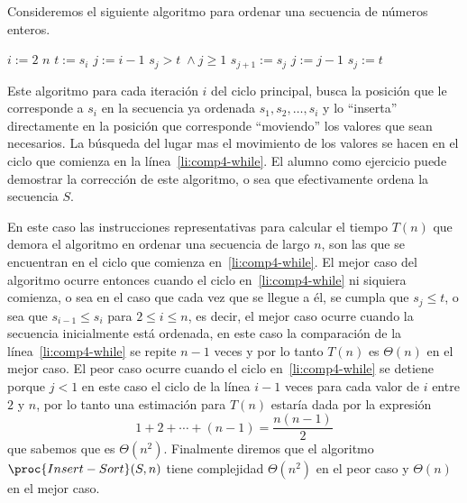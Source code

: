 \begin{ejemplo}
Consideremos el siguiente algoritmo para ordenar una secuencia de números enteros.
\begin{codebox}
\li \For $i:=2$ \To $n$ \label{li:comp4-for}
\li \> $t:=s_i$
\li \> $j:=i-1$
\li \> \While $s_j>t\;\wedge j\geq 1$ \Do \label{li:comp4-while}
\li \> \> $s_{j+1}:=s_j$ \label{li:comp4-asig}
\li \> \> $j:=j-1$ \label{li:comp4-dec}
\li \> $s_j:=t$
\end{codebox}

Este algoritmo para cada iteración $i$ del ciclo principal, busca la posición que le corresponde a $s_i$ en la secuencia ya ordenada $s_1,s_2,\ldots,s_i$ y lo ``inserta'' directamente en la posición que corresponde ``moviendo'' los valores que sean necesarios.
La búsqueda del lugar mas el movimiento de los valores se hacen en el ciclo que comienza en la línea~\ref{li:comp4-while}.
El alumno como ejercicio puede demostrar la corrección de este algoritmo, o sea que efectivamente ordena la secuencia $S$.

En este caso las instrucciones representativas para calcular el tiempo $T(n)$ que demora el algoritmo en ordenar una secuencia de largo $n$, son las que se encuentran en el ciclo que comienza en~\ref{li:comp4-while}.
El mejor caso del algoritmo ocurre entonces cuando el ciclo en~\ref{li:comp4-while} ni siquiera comienza, o sea en el caso que cada vez que se llegue a él, se cumpla que $s_j\leq t$, o sea que $s_{i-1}\leq s_i$ para $2\leq i\leq n$, es decir, el mejor caso ocurre cuando la secuencia inicialmente está ordenada, en este caso la comparación de la línea~\ref{li:comp4-while} se repite $n-1$ veces y por lo tanto $T(n)$ es $\Theta(n)$ en el mejor caso.
El peor caso ocurre cuando el ciclo en~\ref{li:comp4-while} se detiene porque $j<1$ en este caso el ciclo de la línea $i-1$ veces para cada valor de $i$ entre $2$ y $n$, por lo tanto una estimación para $T(n)$ estaría dada por la expresión
\[
1+2+\cdots + (n-1)=\frac{n(n-1)}{2}
\]
que sabemos que es $\Theta(n^2)$.
Finalmente diremos que el algoritmo $\proc{Insert-Sort}(S,n)$ tiene complejidad $\Theta(n^2)$ en el peor caso y $\Theta(n)$ en el mejor caso.
\end{ejemplo}

